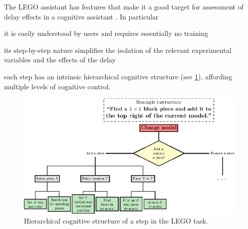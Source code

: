 \documentclass[10pt,letterpaper]{article}
\providecommand{\DIFaddtex}[1]{#1} %
\providecommand{\DIFdeltex}[1]{} %
\providecommand{\DIFaddbegin}{\protect\color{blue}} %
\providecommand{\DIFaddend}{\protect\color{black}} %
\providecommand{\DIFdelbegin}{\protect\color{red}} %
\providecommand{\DIFdelend}{\protect\color{black}} %
\providecommand{\DIFaddbeginFL}{} %
\providecommand{\DIFaddendFL}{} %
\providecommand{\DIFdelbeginFL}{} %
\providecommand{\DIFdelendFL}{} %
\providecommand{\DIFadd}[1]{\texorpdfstring{\DIFaddtex{#1}}{#1}} %
\providecommand{\DIFdel}[1]{\texorpdfstring{\DIFdeltex{#1}}{}} %
\newcommand{\DIFscaledelfig}{0.5}
\newlength{\DIFdelgraphicswidth} %
\newlength{\DIFdelgraphicsheight} %
\newcommand{\DIFaddincludegraphics}[2][]{{\color{blue}\fbox{\DIFOincludegraphics[#1]{#2}}}} %
\newcommand{\DIFdelincludegraphics}[2][]{%
\sbox{\DIFdelgraphicsbox}{\DIFOincludegraphics[#1]{#2}}%
\settoboxwidth{\DIFdelgraphicswidth}{\DIFdelgraphicsbox} %
\settoboxtotalheight{\DIFdelgraphicsheight}{\DIFdelgraphicsbox} %
\scalebox{\DIFscaledelfig}{%
\parbox[b]{\DIFdelgraphicswidth}{\usebox{\DIFdelgraphicsbox}\\[-\baselineskip] \rule{\DIFdelgraphicswidth}{0em}}\llap{\resizebox{\DIFdelgraphicswidth}{\DIFdelgraphicsheight}{%
\setlength{\unitlength}{\DIFdelgraphicswidth}%
\begin{picture}(1,1)%
\thicklines\linethickness{2pt} %
{\color[rgb]{1,0,0}\put(0,0){\framebox(1,1){}}}%
{\color[rgb]{1,0,0}\put(0,0){\line( 1,1){1}}}%
{\color[rgb]{1,0,0}\put(0,1){\line(1,-1){1}}}%
\end{picture}%
}\hspace*{3pt}}} %
} %
\DeclareRobustCommand{\DIFaddbegin}{\DIFOaddbegin \let\includegraphics\DIFaddincludegraphics} %
\DeclareRobustCommand{\DIFaddend}{\DIFOaddend \let\includegraphics\DIFOincludegraphics} %
\DeclareRobustCommand{\DIFdelbegin}{\DIFOdelbegin \let\includegraphics\DIFdelincludegraphics} %
\DeclareRobustCommand{\DIFdelend}{\DIFOaddend \let\includegraphics\DIFOincludegraphics} %
\DeclareRobustCommand{\DIFaddbeginFL}{\DIFOaddbeginFL \let\includegraphics\DIFaddincludegraphics} %
\DeclareRobustCommand{\DIFaddendFL}{\DIFOaddendFL \let\includegraphics\DIFOincludegraphics} %
\DeclareRobustCommand{\DIFdelbeginFL}{\DIFOdelbeginFL \let\includegraphics\DIFdelincludegraphics} %
\DeclareRobustCommand{\DIFdelendFL}{\DIFOaddendFL \let\includegraphics\DIFOincludegraphics} %
\begin{document}
The LEGO assistant has features that make it a good target for assessment of delay effects in a cognitive assistant\DIFdelbegin \DIFdel{:
}%
\DIFdelend \DIFaddbegin \DIFadd{.
In particular
}\begin{enumerate*}[itemjoin={{, }},
                  itemjoin*={{, and }},
                  label={{(\arabic*)}}]
    \item it is easily understood by users and requires essentially no training
    \item its step-by-step nature simplifies the isolation of the relevant experimental variables and the effects of the delay
    \item each step has an intrinsic hierarchical cognitive structure (see \cref{fig:lego:hierarchical}), affording multiple levels of cognitive control. 
\end{enumerate*}
\DIFaddend 

\begin{figure}[h]
  \centering
  \DIFdelbeginFL %
\DIFdelendFL %
  \DIFaddbeginFL \includegraphics[width=\textwidth]{plots/lego_hierarchy_diagram_standalone.eps}
  \DIFaddendFL \caption{Hierarchical cognitive structure of a step in the LEGO task.}
  \label{fig:lego:hierarchical}
\end{figure}
\end{document}
